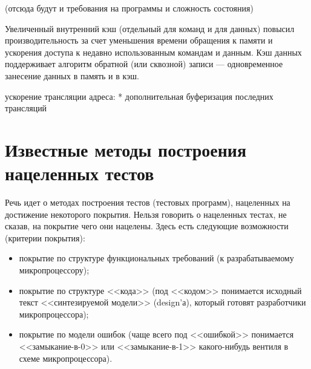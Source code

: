 \documentclass[14pt]{extreport}
\newcommand{\LRU}{\textsf{LRU}\xspace}
\newcommand{\FIFO}{\textsf{FIFO}\xspace}
\begin{document}
(отсюда будут и требования на программы и сложность состояния)

Увеличенный внутренний кэш (отдельный для команд и для данных) повысил производительность за счет уменьшения времени обращения к памяти и ускорения доступа к недавно использованным командам и данным. Кэш данных поддерживает алгоритм обратной (или сквозной) записи — одновременное занесение данных в память и в кэш.

ускорение трансляции адреса:
* дополнительная буферизация последних трансляций

%


\section{Известные методы построения нацеленных тестов}

Речь идет о методах построения тестов (тестовых программ), нацеленных на достижение некоторого покрытия. Нельзя говорить о нацеленных тестах, не сказав, на покрытие чего они нацелены. Здесь есть следующие возможности (критерии покрытия):
\begin{itemize}
	\item покрытие по структуре функциональных требований (к разрабатываемому микропроцессору);
	\item покрытие по структуре <<кода>> (под <<кодом>> понимается исходный текст <<синтезируемой модели>> (design'а), который готовят разработчики микропроцессора);
	\item покрытие по модели ошибок (чаще всего под <<ошибкой>> понимается <<замыкание-в-0>> или <<замыкание-в-1>> какого-нибудь вентиля в схеме микропроцессора).
\end{itemize}
\end{document}
